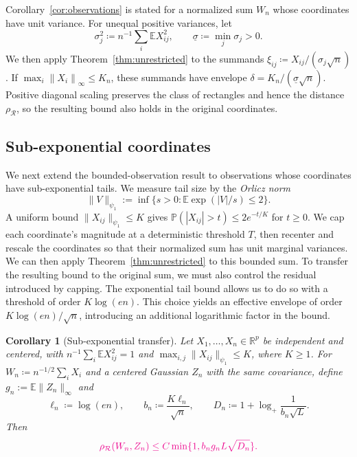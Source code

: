 \documentclass[11pt,letterpaper]{article}
\newenvironment{recovered}{}{}
\newcommand{\vSix}[1]{{\color{magenta}#1}}
\newtheorem{corollary}{Corollary}
\theoremstyle{remark}
\newcommand{\E}{\mathbb E}
\newcommand{\Pp}{\mathbb P}
\newcommand{\R}{\mathbb R}
\newcommand{\norm}[1]{\left\lVert#1\right\rVert}
\newcommand{\rh}{\rho_{\mathcal R}}
\begin{document}
\begin{recovered}
Corollary~\ref{cor:observations} is stated for a normalized sum \(W_n\)
whose coordinates have unit variance. For unequal positive variances, let
\[
 \sigma_j^2\coloneqq n^{-1}\sum_i\E X_{ij}^2,
 \qquad
 \underline\sigma\coloneqq \min_j\sigma_j>0.
\]
We then apply Theorem~\ref{thm:unrestricted} to the summands
\(\xi_{ij}\coloneqq X_{ij}/(\sigma_j\sqrt n)\). If
\(\max_i\norm{X_i}_\infty\le K_n\), these summands have
envelope \(\delta=K_n/(\underline\sigma\sqrt n)\).
Positive diagonal scaling preserves the class of rectangles and hence
the distance \(\rh\), so the resulting bound also holds in the
original coordinates.
\end{recovered}

\subsection{Sub-exponential coordinates}\label{sec:subexponential}
\begin{recovered}
We next extend the bounded-observation result to observations whose
coordinates have sub-exponential tails. We measure tail size by the
\emph{Orlicz norm}
\[
 \|V\|_{\psi_1}:=\inf\{s>0:\E\exp(|V|/s)\le2\}.
\]
A uniform bound \(\|X_{ij}\|_{\psi_1}\le K\) gives
\(\Pp(|X_{ij}|>t)\le2e^{-t/K}\) for \(t\ge0\).
We cap each coordinate's magnitude at a deterministic threshold \(T\),
then recenter and rescale the coordinates so that their normalized
sum has unit marginal variances. We can then apply
Theorem~\ref{thm:unrestricted} to this bounded sum. To transfer the
resulting bound to the original sum, we must also control the residual
introduced by capping. The exponential tail bound allows us to do so
with a threshold of order \(K\log(en)\). This choice yields an
effective envelope of order \(K\log(en)/\sqrt n\), introducing an
additional logarithmic factor in the bound.
\end{recovered}

\begin{corollary}[Sub-exponential transfer]\label{cor:subexponential}
Let \(X_1,\ldots,X_n\in\R^p\) be independent and centered, with
\(n^{-1}\sum_i\E X_{ij}^2=1\) and
\(\max_{i,j}\|X_{ij}\|_{\psi_1}\le K\), where \(K\ge1\).
For \(W_n\coloneqq n^{-1/2}\sum_iX_i\) and a centered Gaussian \(Z_n\)
with the same covariance, \vSix{define \(g_n:=\E\|Z_n\|_\infty\) and}
\[
 \ell_n\coloneqq \log(en),\qquad b_n\coloneqq \frac{K\ell_n}{\sqrt n},\qquad
 D_n\coloneqq 1+\log_+\frac1{b_n\sqrt L}.
\]
Then
\begin{equation}
 \vSix{\rh(W_n,Z_n)\le C\min\{1,b_ng_nL\sqrt{D_n}\}.}
 \label{eq:subexponential}
\end{equation}

\end{corollary}
\end{document}
